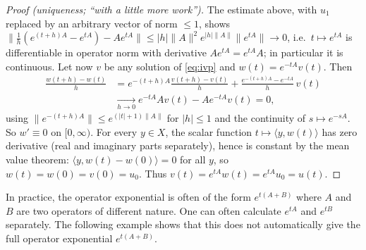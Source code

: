 \documentclass[11pt,a4paper]{article}
\numberwithin{equation}{section}
\newcommand{\ip}[2]{\langle #1, #2\rangle}
\theoremstyle{plain}
\theoremstyle{definition}
\theoremstyle{plain}
\theoremstyle{definition}
\begin{document}
\begin{proof}[Proof (uniqueness; ``with a little more work'')]
The estimate above, with $u_1$ replaced by an arbitrary vector of norm $\le1$, shows
$\big\|\frac1h(e^{(t+h)A}-e^{tA})-Ae^{tA}\big\|\le|h|\|A\|^2e^{|h|\|A\|}\|e^{tA}\|\to0$,
i.e.\ $t\mapsto e^{tA}$ is differentiable in operator norm with derivative $Ae^{tA}=e^{tA}A$;
in particular it is continuous. Let now $v$ be any solution of \eqref{eq:ivp} and
$w(t)=e^{-tA}v(t)$. Then
\begin{align*}
\frac{w(t+h)-w(t)}h&=e^{-(t+h)A}\frac{v(t+h)-v(t)}h+\frac{e^{-(t+h)A}-e^{-tA}}h\,v(t)\\
&\xrightarrow[h\to0]{}e^{-tA}Av(t)-Ae^{-tA}v(t)=0,
\end{align*}
using $\|e^{-(t+h)A}\|\le e^{(|t|+1)\|A\|}$ for $|h|\le1$ and the continuity of
$s\mapsto e^{-sA}$. So $w'\equiv0$ on $[0,\infty)$. For every $y\in X$, the scalar
function $t\mapsto\ip{y}{w(t)}$ has zero derivative (real and imaginary parts separately),
hence is constant by the mean value theorem: $\ip{y}{w(t)-w(0)}=0$ for all $y$, so
$w(t)=w(0)=v(0)=u_0$. Thus $v(t)=e^{tA}w(t)=e^{tA}u_0=u(t)$.
\end{proof}

In practice, the operator exponential is often of the form $e^{t(A+B)}$ where $A$ and $B$ are
two operators of different nature. One can often calculate $e^{tA}$ and $e^{tB}$
separately. The following example shows that this does not automatically give the full
operator exponential $e^{t(A+B)}$.
\end{document}

